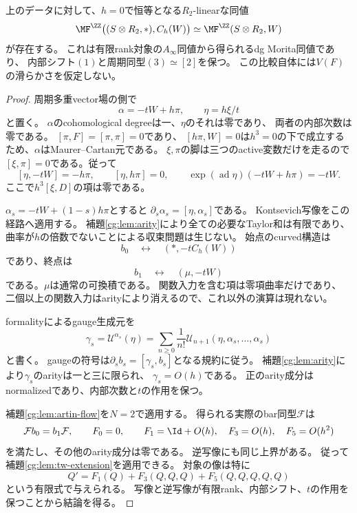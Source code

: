 \begin{theorem}
\label{cg:thm:mf-comparison}
上のデータに対して、$h=0$で恒等となる$R_2$-linearな同値
\begin{equation}\label{cg:eq:MF-comparison}
 \MF^{\ZZ}\bigl((S\otimes R_2,*),C_h(W)\bigr)
 \simeq
 \MF^{\ZZ}(S\otimes R_2,W)
\end{equation}
が存在する。
これは有限rank対象の$A_\infty$同値から得られるdg Morita同値であり、
内部シフト$(1)$と周期同型$(3)\simeq[2]$を保つ。
この比較自体には$V(F)$の滑らかさを仮定しない。
\end{theorem}
\begin{proof}
周期多重vector場の側で
\[
 \alpha=-tW+h\pi,\qquad \eta=h\xi/t
\]
と置く。
$\alpha$のcohomological degreeは一、$\eta$のそれは零であり、
両者の内部次数は零である。
$[\pi,F]=[\pi,\pi]=0$であり、
$[h\pi,W]=0$は$h^3=0$の下で成立するため、$\alpha$はMaurer--Cartan元である。
$\xi,\pi$の脚は三つのactive変数だけを走るので
$[\xi,\pi]=0$である。従って
\begin{equation}\label{cg:eq:gauge-calculation}
 [\eta,-tW]=-h\pi,\qquad [\eta,h\pi]=0,\qquad
 \exp(\operatorname{ad}\eta)(-tW+h\pi)=-tW.
\end{equation}
ここで$h^3[\xi,D]$の項は零である。

$\alpha_s=-tW+(1-s)h\pi$とすると
$\partial_s\alpha_s=[\eta,\alpha_s]$である。
Kontsevich写像をこの経路へ適用する。
補題\ref{cg:lem:arity}により全ての必要なTaylor和は有限であり、
曲率が$h$の倍数でないことによる収束問題は生じない。
始点のcurved構造は
\[
 b_0\quad\longleftrightarrow\quad (*,-tC_h(W))
\]
であり、終点は
\[
 b_1\quad\longleftrightarrow\quad (\mu,-tW)
\]
である。$\mu$は通常の可換積である。
関数入力を含む項は零項曲率だけであり、
二個以上の関数入力はarityにより消えるので、これ以外の演算は現れない。

formalityによるgauge生成元を
\[
 \gamma_s=\mathcal U^{\alpha_s}(\eta)
 =\sum_{n\ge0}\frac1{n!}
   \mathcal U_{n+1}(\eta,\alpha_s,\ldots,\alpha_s)
\]
と書く。
gaugeの符号は$\partial_s b_s=[\gamma_s,b_s]$となる規約に従う。
補題\ref{cg:lem:arity}により$\gamma_s$のarityは一と三に限られ、
$\gamma_s=O(h)$である。
正のarity成分はnormalizedであり、内部次数と$t$の作用を保つ。

補題\ref{cg:lem:artin-flow}を$N=2$で適用する。
得られる実際のbar同型$\mathcal F$は
\[
 \mathcal F b_0=b_1\mathcal F,\qquad
 F_0=0,\qquad F_1=\Id+O(h),\quad F_3=O(h),\quad F_5=O(h^2)
\]
を満たし、その他のarity成分は零である。
逆写像にも同じ上界がある。
従って補題\ref{cg:lem:tw-extension}を適用できる。
対象の像は特に
\[
 Q'=F_1(Q)+F_3(Q,Q,Q)+F_5(Q,Q,Q,Q,Q)
\]
という有限式で与えられる。
写像と逆写像が有限rank、内部シフト、$t$の作用を保つことから結論を得る。
\end{proof}


